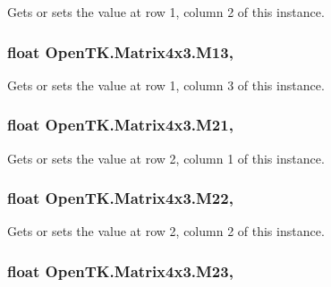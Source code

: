 Gets or sets the value at row 1, column 2 of this instance. 

\hypertarget{struct_open_t_k_1_1_matrix4x3_aaa90dc331cfc17a832be7f671cda573f}{
\subsubsection[{M13}]{\setlength{\rightskip}{0pt plus 5cm}float Open\-T\-K.\-Matrix4x3.\-M13\hspace{0.3cm}{\ttfamily [get]}, {\ttfamily [set]}}}\label{struct_open_t_k_1_1_matrix4x3_aaa90dc331cfc17a832be7f671cda573f}


Gets or sets the value at row 1, column 3 of this instance. 

\hypertarget{struct_open_t_k_1_1_matrix4x3_aec42267f4cc6a67ca7d20bd991b063f0}{
\subsubsection[{M21}]{\setlength{\rightskip}{0pt plus 5cm}float Open\-T\-K.\-Matrix4x3.\-M21\hspace{0.3cm}{\ttfamily [get]}, {\ttfamily [set]}}}\label{struct_open_t_k_1_1_matrix4x3_aec42267f4cc6a67ca7d20bd991b063f0}


Gets or sets the value at row 2, column 1 of this instance. 

\hypertarget{struct_open_t_k_1_1_matrix4x3_a2fdbd4d53dd67560abd2b03e62fbd56c}{
\subsubsection[{M22}]{\setlength{\rightskip}{0pt plus 5cm}float Open\-T\-K.\-Matrix4x3.\-M22\hspace{0.3cm}{\ttfamily [get]}, {\ttfamily [set]}}}\label{struct_open_t_k_1_1_matrix4x3_a2fdbd4d53dd67560abd2b03e62fbd56c}


Gets or sets the value at row 2, column 2 of this instance. 

\hypertarget{struct_open_t_k_1_1_matrix4x3_a593393dd96138d9a312c6e0ac197bd10}{
\subsubsection[{M23}]{\setlength{\rightskip}{0pt plus 5cm}float Open\-T\-K.\-Matrix4x3.\-M23\hspace{0.3cm}{\ttfamily [get]}, {\ttfamily [set]}}}\label{struct_open_t_k_1_1_matrix4x3_a593393dd96138d9a312c6e0ac197bd10}


